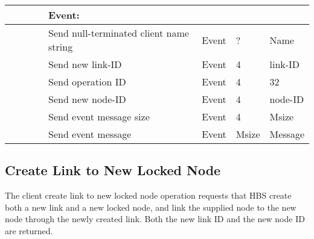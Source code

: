 \begin{tabular}{|p{1.2in}|p{.4in}|p{.4in}|p{.5in}|p{1.2in}|p{.4in}|p{.4in}|p{.5in} |}
\multicolumn{4}{|l}{~}&\multicolumn{4}{|l|}{{\bf Event:}} \\ \hline
                  &        &       &       & Send null-terminated client
                                             name string  & Event  &  ?    & Name  \\ \hline
                  &        &       &       & Send new link-ID  & Event  &   4   &   link-ID    \\  \hline
                  &        &       &       & Send operation 
                                             ID           & Event  &   4   &  32   \\ \hline
                  &        &       &       & Send new node-ID     & Event  &   4   &  node-ID    \\ \hline
                  &        &       &       & Send event message
                                                  size    & Event  &   4   &  Msize \\ \hline
                  &        &       &       & Send event message
                                                          & Event  & Msize & Message  \\ \hline
\end{tabular}
\normalsize
\bigskip




\newpage
\subsection{Create Link to New Locked Node}

The client create link to new locked node operation requests that HBS create both a new
link and a new locked node, and link the supplied node to the new node through the
newly created link.  Both the new link ID and the new node ID are returned. 


